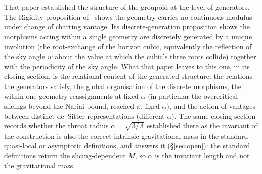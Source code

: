 \documentclass[11pt,a4paper]{article}
\theoremstyle{definition}
\begin{document}
That paper established the structure of the groupoid at the level of generators. The Rigidity proposition of~\cite{JanzenSlicing} shows the geometry carries no continuous modulus under change of charting vantage. Its discrete-generation proposition shows the morphisms acting within a single geometry are discretely generated by a unique involution (the root-exchange of the horizon cubic, equivalently the reflection of the sky angle $w$ about the value at which the cubic's three roots collide) together with the periodicity of the sky angle. What that paper leaves to this one, in its closing section, is the relational content of the generated structure: the relations the generators satisfy, the global organisation of the discrete morphisms, the within-one-geometry reassignments at fixed $\alpha$ (in particular the overcritical slicings beyond the Nariai bound, reached at fixed $\alpha$), and the action of vantages between distinct de~Sitter representations (different $\alpha$). The same closing section records whether the throat radius $\alpha=\sqrt{3/\Lambda}$ established there as the invariant of the construction is also the correct intrinsic gravitational mass in the standard quasi-local or asymptotic definitions, and answers it (\S\ref{sec:open}): the standard definitions return the slicing-dependent $M$, so $\alpha$ is the invariant length and not the gravitational mass.
\end{document}
